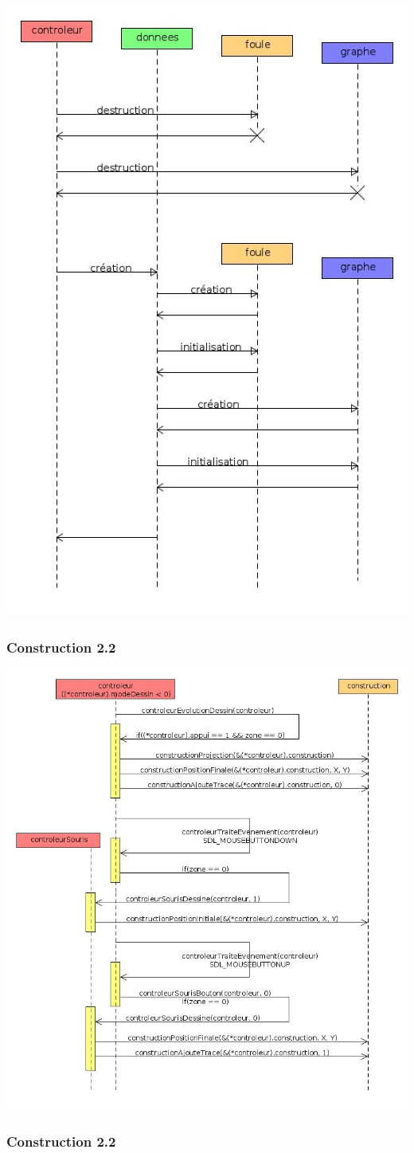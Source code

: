 \includegraphics[width=.35\textwidth]{./illustration/sequenceReinitialisation}
%
\newpage
%
\subsubsection{Construction 2.2}
\includegraphics[width=1.05\textwidth]{./illustration/sequenceControleurConstruction}
%
\newpage
%
\subsubsection{Construction 2.2}



